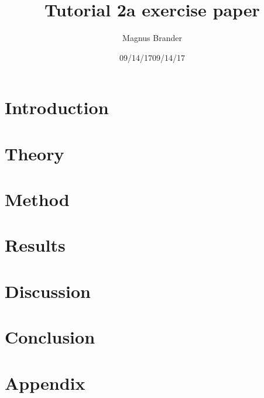 \documentclass[a4paper,12pt,twoside]{article}
\date{09/14/17}
\author{Magnus Brander}
\title{Tutorial 2a exercise paper}
\date{09/14/17}
\begin{document}

\newpage
\tableofcontents
\newpage
\section{Introduction}

\newpage
\section{Theory}
\newpage
\section{Method}
\newpage
\section{Results}
\newpage
\section{Discussion}
\newpage
\section{Conclusion}
\newpage
\section*{Appendix}
\end{document}
